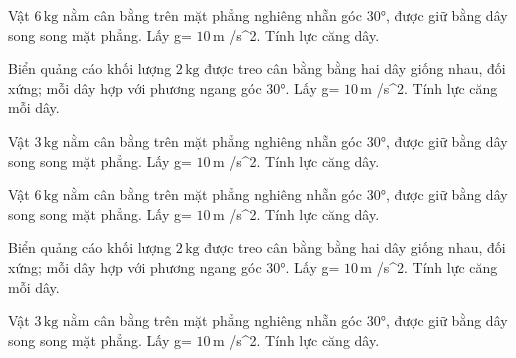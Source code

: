 \begin{ex}
Vật $6\,\text{kg}$ nằm cân bằng trên mặt phẳng nghiêng nhẵn góc 30°, được giữ bằng dây song song mặt phẳng. Lấy g= $10\,\text{m}$ /s^2. Tính lực căng dây.
\end{ex}

\begin{ex}
Biển quảng cáo khối lượng $2\,\text{kg}$ được treo cân bằng bằng hai dây giống nhau, đối xứng; mỗi dây hợp với phương ngang góc 30°. Lấy g= $10\,\text{m}$ /s^2. Tính lực căng mỗi dây.
\end{ex}

\begin{ex}
Vật $3\,\text{kg}$ nằm cân bằng trên mặt phẳng nghiêng nhẵn góc 30°, được giữ bằng dây song song mặt phẳng. Lấy g= $10\,\text{m}$ /s^2. Tính lực căng dây.
\end{ex}

\begin{bt}
Vật $6\,\text{kg}$ nằm cân bằng trên mặt phẳng nghiêng nhẵn góc 30°, được giữ bằng dây song song mặt phẳng. Lấy g= $10\,\text{m}$ /s^2. Tính lực căng dây.
\end{bt}

\begin{bt}
Biển quảng cáo khối lượng $2\,\text{kg}$ được treo cân bằng bằng hai dây giống nhau, đối xứng; mỗi dây hợp với phương ngang góc 30°. Lấy g= $10\,\text{m}$ /s^2. Tính lực căng mỗi dây.
\end{bt}

\begin{bt}
Vật $3\,\text{kg}$ nằm cân bằng trên mặt phẳng nghiêng nhẵn góc 30°, được giữ bằng dây song song mặt phẳng. Lấy g= $10\,\text{m}$ /s^2. Tính lực căng dây.
\end{bt}


